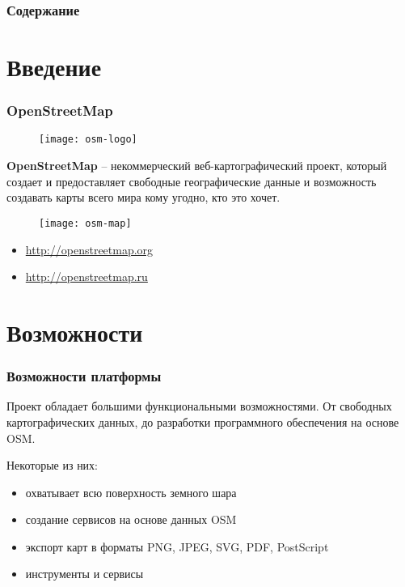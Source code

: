 \begin{frame}
    \frametitle{Содержание}
    \tableofcontents
\end{frame}

\section{Введение}
\begin{frame}
    \frametitle{OpenStreetMap}
    \begin{minipage}[h]{0.20\textwidth}
        \begin{figure}[ht!]
            \texttt{[image: osm-logo]}
        \end{figure}
    \end{minipage}
    \begin{minipage}[h]{0.78\textwidth}
        \textbf{OpenStreetMap} -- некоммерческий веб-картографический проект, который создает и 
        предоставляет свободные географические данные и возможность создавать карты всего мира 
        кому угодно, кто это хочет.
    \end{minipage}

    \begin{figure}[ht!]
        \texttt{[image: osm-map]}
    \end{figure}

    \scriptsize\begin{itemize}
        \item \url{http://openstreetmap.org}
        \item \url{http://openstreetmap.ru}
    \end{itemize}\normalsize
\end{frame}

\section{Возможности}
\begin{frame}
    \frametitle{Возможности платформы}
    Проект обладает большими функциональными возможностями. От свободных 
    картографических данных, до разработки программного обеспечения на основе OSM.
    
    Некоторые из них:
    \begin{itemize}
        \item охватывает всю поверхность земного шара
        \item создание сервисов на основе данных OSM
        \item экспорт карт в форматы PNG, JPEG, SVG, PDF, PostScript
        \item инструменты и сервисы
    \end{itemize}
\end{frame}


